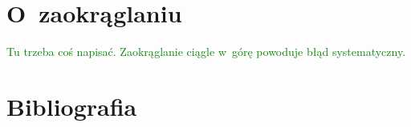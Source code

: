 \documentclass[a4paper,11pt]{article}
\newcommand{\toadd}[1]{\textcolor{green}{#1}}
\begin{document}
\appendix  %



\section{O~zaokrąglaniu}
\label{sec:zaokrąglanie}

\toadd{Tu trzeba coś napisać. Zaokrąglanie ciągle w~górę powoduje błąd
  systematyczny.}



\section*{Bibliografia}
\end{document}
